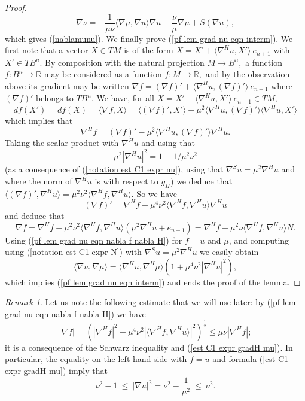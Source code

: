 \documentclass[10pt,reqno,oneside]{amsart}
\theoremstyle{definition}
\theoremstyle{remark}
\newtheorem{rem}[lem]{Remark}
\newcommand{\R}{\mathbb{R}}
\begin{document}
\begin{proof}
$$\nabla\nu=-\frac{1}{\mu\nu}\langle\nabla\mu,\nabla u\rangle\nabla u-\frac{\nu}{\mu}\nabla\mu+S(\nabla u),$$
which gives (\ref{nablamunu}). We finally prove (\ref{pf lem grad nu eqn interm}). We first note that a vector $X\in TM$ is of the form $X=X'+\langle\nabla^Hu,X'\rangle\ e_{n+1}$ with $X'\in TB^n$. By composition with the natural projection $M\rightarrow B^n,$ a function $f:B^n\rightarrow\R$ may be considered as a function $f:M\rightarrow\R,$ and by the observation above its gradient may be written $\nabla f=(\nabla f)'+\langle\nabla ^H u,(\nabla f)'\rangle\ e_{n+1}$ where $(\nabla f)'$ belongs to $TB^n.$ We have, for all $X=X'+\langle\nabla^Hu,X'\rangle\ e_{n+1}\in TM,$
$$df(X')=df(X)=\langle\nabla f,X\rangle=\langle (\nabla f)',X'\rangle-\mu^2\langle\nabla ^H u,(\nabla f)'\rangle\langle\nabla^Hu,X'\rangle$$
which implies that 
$$\nabla^Hf=(\nabla f)'-\mu^2\langle\nabla^Hu,(\nabla f)'\rangle\nabla^H u.$$ 
Taking the scalar product with $\nabla^Hu$ and using that 
\begin{equation}\label{est C1 expr gradH mu}
\mu^2|\nabla^Hu|^2=1-1/{\mu^2\nu^2}
\end{equation} 
(as a consequence of (\ref{notation est C1 expr nu}), using that $\nabla^Su=\mu^2\nabla^Hu$ and where the norm of $\nabla^Hu$ is with respect to $g_H$) we deduce that $\langle(\nabla f)',\nabla^Hu\rangle=\mu^2\nu^2\langle\nabla^Hf,\nabla^Hu\rangle.$ So we have
$$(\nabla f)'=\nabla^Hf+\mu^4\nu^2\langle\nabla^Hf,\nabla^Hu\rangle\nabla^Hu$$
and deduce that 
\begin{equation}\label{pf lem grad nu eqn nabla f nabla H}
\nabla f=\nabla^Hf+\mu^2\nu^2\langle\nabla^Hf,\nabla^Hu\rangle\left(\mu^2\nabla^Hu+e_{n+1}\right)=\nabla^Hf+\mu^2\nu\langle\nabla^Hf,\nabla^Hu\rangle N.
\end{equation}
Using (\ref{pf lem grad nu eqn nabla f nabla H}) for $f=u$ and $\mu$, and computing using (\ref{notation est C1 expr N}) with $\nabla^Su=\mu^2\nabla^Hu$ we easily obtain
$$\langle\nabla u,\nabla\mu\rangle=\langle\nabla^H u,\nabla^H\mu\rangle\left(1+\mu^4\nu^2|\nabla^Hu|^2\right),$$
which implies (\ref{pf lem grad nu eqn interm}) and ends the proof of the lemma.
\end{proof}
\begin{rem}
Let us note the following estimate that we will use later: by (\ref{pf lem grad nu eqn nabla f nabla H}) we have
\begin{equation}\label{nabla f leq nablaH f}
|\nabla f|=\left(|\nabla^Hf|^2+\mu^4\nu^2|\langle\nabla^Hf,\nabla^Hu\rangle|^2\right)^{\frac{1}{2}}\leq \mu\nu|\nabla^Hf|;
\end{equation}
it is a consequence of the Schwarz inequality and (\ref{est C1 expr gradH mu}). In particular, the equality on the left-hand side with $f=u$ and formula (\ref{est C1 expr gradH mu}) imply that
\begin{equation}\label{C1 norm nabla u leq mu nu}
\nu^2-1\ \leq\ |\nabla u|^2=\nu^2-\frac{1}{\mu^2}\ \leq\ \nu^2.
\end{equation}

\end{rem}
\end{document}
